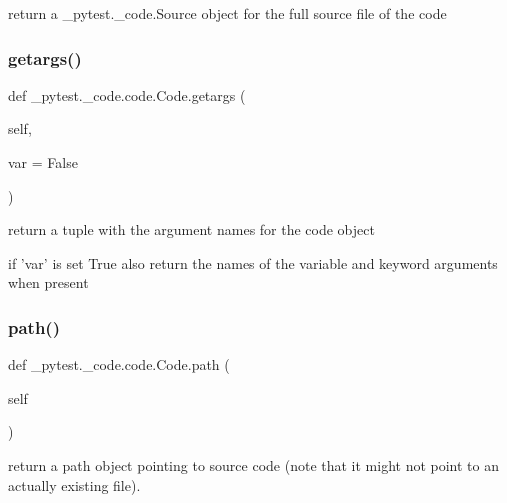 \begin{DoxyVerb}return a _pytest._code.Source object for the full source file of the code
\end{DoxyVerb}
 \mbox{\label{class__pytest_1_1__code_1_1code_1_1_code_a6c188b13651220697432afc00f320f18}} 
\subsubsection{\texorpdfstring{getargs()}{getargs()}}
{\footnotesize\ttfamily def \+\_\+pytest.\+\_\+code.\+code.\+Code.\+getargs (\begin{DoxyParamCaption}\item[{}]{self,  }\item[{}]{var = {\ttfamily False} }\end{DoxyParamCaption})}

\begin{DoxyVerb}return a tuple with the argument names for the code object

    if 'var' is set True also return the names of the variable and
    keyword arguments when present
\end{DoxyVerb}
 \mbox{\label{class__pytest_1_1__code_1_1code_1_1_code_a026b60b74a3205adcfc8216f1ba5d1f9}} 
\subsubsection{\texorpdfstring{path()}{path()}}
{\footnotesize\ttfamily def \+\_\+pytest.\+\_\+code.\+code.\+Code.\+path (\begin{DoxyParamCaption}\item[{}]{self }\end{DoxyParamCaption})}

\begin{DoxyVerb}return a path object pointing to source code (note that it
might not point to an actually existing file). \end{DoxyVerb}
 \mbox{\label{class__pytest_1_1__code_1_1code_1_1_code_ac44c9a145c7636c7c90bb394fe75dce9}} 
